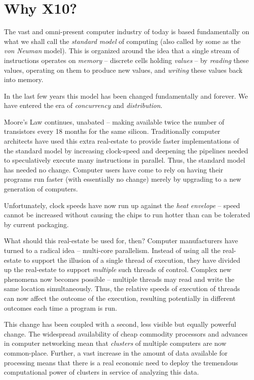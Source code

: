 \chapter{Why X10?}\label{chap:whyx10}

The vast and omni-present computer industry of today is based fundamentally on what we shall call the {\em standard model} of computing (also called by some as the {\em von Neuman} model). This is organized around the idea that a single stream of instructions operates on
 {\em memory} -- discrete cells holding {\em values}  -- by {\em reading}  these values, operating on them to produce new values, and {\em writing} these values back into memory.

In the last few years this model has been changed fundamentally and forever. We have entered the era of {\em concurrency} and {\em distribution}.

Moore's Law continues, unabated -- making available twice the number of transistors every 18 months for the same silicon. Traditionally computer architects have used this extra real-estate to provide faster implementations of the standard model by increasing clock-speed and deepening the pipelines needed to speculatively execute many instructions in parallel. Thus, the standard model has needed no change. Computer users have come to rely on having their programs run faster (with essentially no change) merely by upgrading to a new generation of computers.

Unfortunately, clock speeds have now run up against the {\em heat envelope} -- speed cannot be increased without causing the chips to run hotter than can be tolerated by current packaging. 

What should this real-estate be used for, then? Computer manufacturers have turned to a radical idea -- multi-core parallelism. Instead of using all the real-estate to support the illusion of a single thread of execution, they have divided up the real-estate to support {\em multiple} such threads of control. Complex new phenomena now becomes possible -- multiple threads may read and write the same location simultaneously. Thus, the relative speeds of execution of threads can now affect the outcome of the execution, resulting potentially in different outcomes each time a program is run. 

This change has been coupled with a second, less visible but equally powerful change. The widespread availability of cheap commodity processors and advances in computer networking mean that {\em clusters} of multiple computers are now common-place. Further, a vast increase in the amount of data available for processing means that there is a real economic need to deploy the tremendous computational power of clusters in service of analyzing this data.

